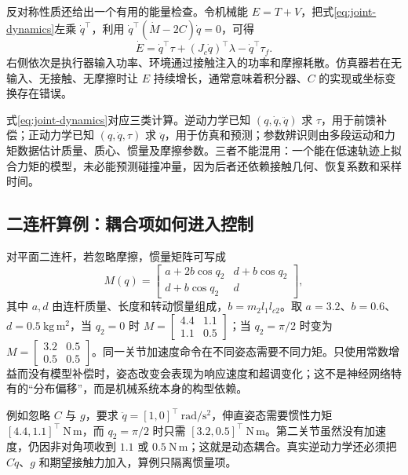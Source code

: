 反对称性质还给出一个有用的能量检查。令机械能 $E=T+V$，把式\eqref{eq:joint-dynamics}左乘 $\dot q^\top$，利用 $\dot q^\top(\dot M-2C)\dot q=0$，可得
\begin{equation}
\dot E=\dot q^\top\tau+(J_c\dot q)^\top\lambda-\dot q^\top\tau_f.
\label{eq:robot-power-balance}
\end{equation}
右侧依次是执行器输入功率、环境通过接触注入的功率和摩擦耗散。仿真器若在无输入、无接触、无摩擦时让 $E$ 持续增长，通常意味着积分器、$C$ 的实现或坐标变换存在错误。

式\eqref{eq:joint-dynamics}对应三类计算。逆动力学已知 $(q,\dot q,\ddot q)$ 求 $\tau$，用于前馈补偿；正动力学已知 $(q,\dot q,\tau)$ 求 $\ddot q$，用于仿真和预测；参数辨识则由多段运动和力矩数据估计质量、质心、惯量及摩擦参数。三者不能混用：一个能在低速轨迹上拟合力矩的模型，未必能预测碰撞冲量，因为后者还依赖接触几何、恢复系数和采样时间。

\subsection{二连杆算例：耦合项如何进入控制}

对平面二连杆，若忽略摩擦，惯量矩阵可写成
\begin{equation}
M(q)=\begin{bmatrix}
a+2b\cos q_2 & d+b\cos q_2\\
d+b\cos q_2 & d
\end{bmatrix},
\end{equation}
其中 $a,d$ 由连杆质量、长度和转动惯量组成，$b=m_2l_1l_{c2}$。取 $a=3.2$、$b=0.6$、$d=0.5\ \mathrm{kg\,m^2}$，当 $q_2=0$ 时
$M=\left[\begin{smallmatrix}4.4&1.1\\1.1&0.5\end{smallmatrix}\right]$；当 $q_2=\pi/2$ 时变为
$M=\left[\begin{smallmatrix}3.2&0.5\\0.5&0.5\end{smallmatrix}\right]$。同一关节加速度命令在不同姿态需要不同力矩。只使用常数增益而没有模型补偿时，姿态改变会表现为响应速度和超调变化；这不是神经网络特有的“分布偏移”，而是机械系统本身的构型依赖。

例如忽略 $C$ 与 $g$，要求 $\ddot q=[1,0]^\top\ \mathrm{rad/s^2}$，伸直姿态需要惯性力矩 $[4.4,1.1]^\top\ \mathrm{N\,m}$，而 $q_2=\pi/2$ 时只需 $[3.2,0.5]^\top\ \mathrm{N\,m}$。第二关节虽然没有加速度，仍因非对角项收到 $1.1$ 或 $0.5\ \mathrm{N\,m}$；这就是动态耦合。真实逆动力学还必须把 $C\dot q$、$g$ 和期望接触力加入，算例只隔离惯量项。

